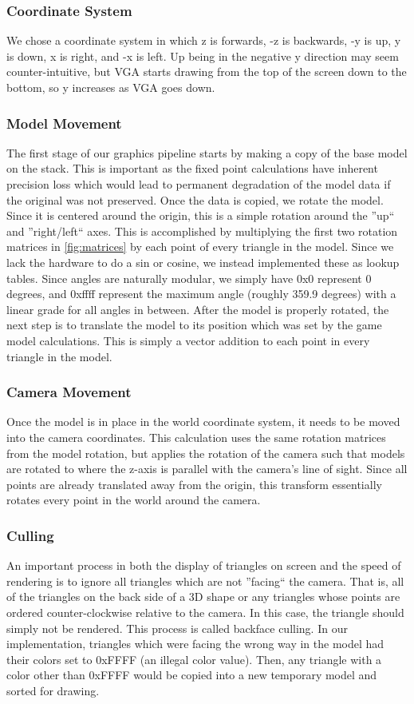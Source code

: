 \documentclass[onecolumn]{IEEEtran}
\begin{document}
\subsubsection{Coordinate System}
We chose a coordinate system in which z is forwards, -z is backwards, -y is up, y is down, x is right, and -x is left.  Up being in the negative y direction may seem counter-intuitive, but VGA starts drawing from the top of the screen down to the bottom, so y increases as VGA goes down.

\subsubsection{Model Movement}
The first stage of our graphics pipeline starts by making a copy of the base model on the stack.  This is important as the fixed point calculations have inherent precision loss which would lead to permanent degradation of the model data if the original was not preserved.  Once the data is copied, we rotate the model.  Since it is centered around the origin, this is a simple rotation around the ''up`` and ''right/left`` axes.  This is accomplished by multiplying the first two rotation matrices in \ref{fig:matrices} by each point of every triangle in the model.  Since we lack the hardware to do a sin or cosine, we instead implemented these as lookup tables.  Since angles are naturally modular, we simply have 0x0 represent 0 degrees, and 0xffff represent the maximum angle (roughly 359.9 degrees) with a linear grade for all angles in between.  After the model is properly rotated, the next step is to translate the model to its position which was set by the game model calculations.  This is simply a vector addition to each point in every triangle in the model.

\subsubsection{Camera Movement}
Once the model is in place in the world coordinate system, it needs to be moved into the camera coordinates.  This calculation uses the same rotation matrices from the model rotation, but applies the rotation of the camera such that models are rotated to where the z-axis is parallel with the camera's line of sight.  Since all points are already translated away from the origin, this transform essentially rotates every point in the world around the camera.

\subsubsection{Culling}
An important process in both the display of triangles on screen and the speed of rendering is to ignore all triangles which are not ''facing`` the camera.  That is, all of the triangles on the back side of a 3D shape or any triangles whose points are ordered counter-clockwise relative to the camera.  In this case, the triangle should simply not be rendered.  This process is called backface culling.  In our implementation, triangles which were facing the wrong way in the model had their colors set to 0xFFFF (an illegal color value).  Then, any triangle with a color other than 0xFFFF would be copied into a new temporary model and sorted for drawing.
\end{document}
